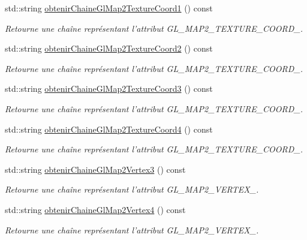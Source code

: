 \begin{DoxyCompactItemize}
std\-::string \hyperlink{group__utilitaire_gadb7c67ea193286a4088b9dcc172abef6}{obtenir\-Chaine\-Gl\-Map2\-Texture\-Coord1} () const 
\begin{DoxyCompactList}\small\item\em Retourne une chaîne représentant l'attribut G\-L\-\_\-\-M\-A\-P2\-\_\-\-T\-E\-X\-T\-U\-R\-E\-\_\-\-C\-O\-O\-R\-D\-\_. \end{DoxyCompactList}\item 
std\-::string \hyperlink{group__utilitaire_gaf5cb23274f1ad4c504c5aed7947a3432}{obtenir\-Chaine\-Gl\-Map2\-Texture\-Coord2} () const 
\begin{DoxyCompactList}\small\item\em Retourne une chaîne représentant l'attribut G\-L\-\_\-\-M\-A\-P2\-\_\-\-T\-E\-X\-T\-U\-R\-E\-\_\-\-C\-O\-O\-R\-D\-\_. \end{DoxyCompactList}\item 
std\-::string \hyperlink{group__utilitaire_gad4b636ae980e2c420c9a7357fe8d58cc}{obtenir\-Chaine\-Gl\-Map2\-Texture\-Coord3} () const 
\begin{DoxyCompactList}\small\item\em Retourne une chaîne représentant l'attribut G\-L\-\_\-\-M\-A\-P2\-\_\-\-T\-E\-X\-T\-U\-R\-E\-\_\-\-C\-O\-O\-R\-D\-\_. \end{DoxyCompactList}\item 
std\-::string \hyperlink{group__utilitaire_ga0716a8c85e544f43620ea6664c58b570}{obtenir\-Chaine\-Gl\-Map2\-Texture\-Coord4} () const 
\begin{DoxyCompactList}\small\item\em Retourne une chaîne représentant l'attribut G\-L\-\_\-\-M\-A\-P2\-\_\-\-T\-E\-X\-T\-U\-R\-E\-\_\-\-C\-O\-O\-R\-D\-\_. \end{DoxyCompactList}\item 
std\-::string \hyperlink{group__utilitaire_ga7d031ab910660e0f56b3ed4a95d2bfc6}{obtenir\-Chaine\-Gl\-Map2\-Vertex3} () const 
\begin{DoxyCompactList}\small\item\em Retourne une chaîne représentant l'attribut G\-L\-\_\-\-M\-A\-P2\-\_\-\-V\-E\-R\-T\-E\-X\-\_. \end{DoxyCompactList}\item 
std\-::string \hyperlink{group__utilitaire_ga866e31b0b0469c11f0c0bee0bb4f9973}{obtenir\-Chaine\-Gl\-Map2\-Vertex4} () const 
\begin{DoxyCompactList}\small\item\em Retourne une chaîne représentant l'attribut G\-L\-\_\-\-M\-A\-P2\-\_\-\-V\-E\-R\-T\-E\-X\-\_. \end{DoxyCompactList}\item 

\end{DoxyCompactItemize}
